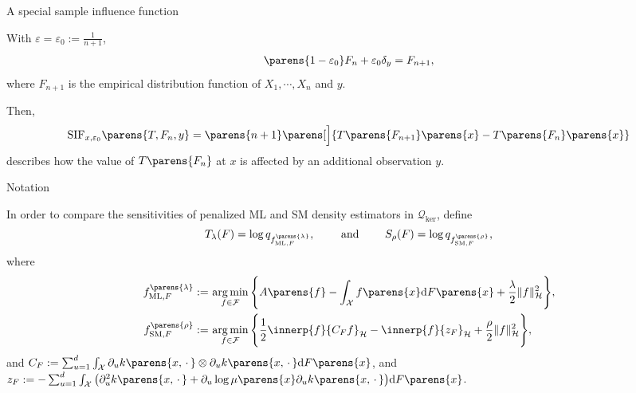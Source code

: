 \documentclass[aspectratio=169,xcolor=dvipsnames]{beamer}
\DeclareMathOperator*{\argmin}{arg\,min}
\newcommand{\SM}{\mathrm{SM}}
\newcommand{\ML}{\mathrm{ML}}
\newcommand{\calQ}{\mathcal{Q}}
\begin{document}
\begin{frame}{A special sample influence function}

	With $\varepsilon = \varepsilon_0 := \frac{1}{n+1}$, 
	\begin{align*}
		\parens{1 - \varepsilon_0} F_n + \varepsilon_0 \delta_y = F_{n+1}, 
	\end{align*}
	where $F_{n+1}$ is the empirical distribution function of $X_1, \cdots, X_n$ and $y$. 
	
	\vspace{10pt}
	
	Then, 
	\begin{align}
		\mathrm{SIF}_{x, \varepsilon_0} \parens{T, F_n, y} = \parens{n+1} \parens[\Big]{T \parens{F_{n+1}} \parens{x} - T \parens{F_n} \parens{x}}
	\end{align}
	describes how the value of $T \parens{F_n}$ at $x$ is affected by an additional observation $y$. 
	
\end{frame}


\begin{frame}{Notation}
	
	In order to compare the sensitivities of penalized ML and SM density estimators in $\calQ_{\mathrm{ker}}$, %
	define 
	\begin{align*}
		T_{\lambda} (F) = \log q_{f_{\ML, F}^{\parens{\lambda}}}, \qquad \text{ and } \qquad S_{\rho} (F) = \log q_{f_{\mathrm{SM}, F}^{\parens{\rho}}}, 
	\end{align*}
	where 
	\begin{align*}
		f_{\ML, F}^{\parens{\lambda}} := & \, \argmin_{f \in \mathcal{F}} \Bigg\{ A \parens{f} - \int_{\mathcal{X}} f \parens{x} \mathrm{d} F \parens{x} + \frac{\lambda}{2} \Vert f \Vert_{\mathcal{H}}^2 \Bigg\}, \\
		f_{\SM, F}^{\parens{\rho}} := & \, \argmin_{f \in \mathcal{F}} \Bigg\{ \frac{1}{2} \innerp{f}{C_F f}_{\mathcal{H}} - \innerp{f}{z_F}_{\mathcal{H}} + \frac{\rho}{2} \Vert f \Vert_{\mathcal{H}}^2 \Bigg\}, 
	\end{align*}
	and $C_F := \sum_{u=1}^d \int_{\mathcal{X}} \partial_u k \parens{x, \,\cdot\,} \otimes \partial_u k \parens{x, \,\cdot\,} \mathrm{d} F \parens{x}$, and $z_F := - \sum_{u=1}^d \int_{\mathcal{X}} \big( \partial_u^2 k \parens{x, \,\cdot\,} + \partial_u \log \mu \parens{x} \partial_u k \parens{x, \,\cdot\,} \big) \mathrm{d} F \parens{x}$. 

\end{frame}
\end{document}

